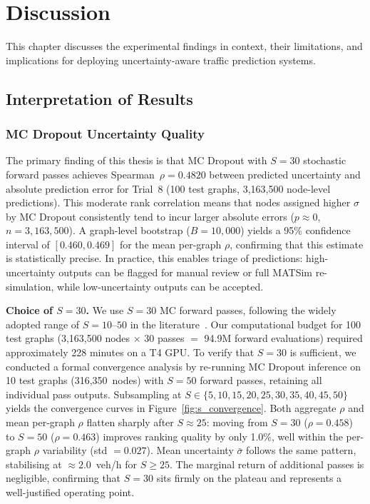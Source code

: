 
\chapter{Discussion}\label{chapter:discussion}

This chapter discusses the experimental findings in context, their limitations, and implications for deploying uncertainty-aware traffic prediction systems.

\section{Interpretation of Results}

\subsection{MC Dropout Uncertainty Quality}

The primary finding of this thesis is that MC Dropout with $S = 30$ stochastic forward passes achieves Spearman~$\rho = 0.4820$ between predicted uncertainty and absolute prediction error for Trial~8 (100 test graphs, 3,163,500 node-level predictions). This moderate rank correlation means that nodes assigned higher $\sigma$ by MC Dropout consistently tend to incur larger absolute errors ($p \approx 0$, $n = 3{,}163{,}500$). A graph-level bootstrap ($B = 10{,}000$) yields a 95\% confidence interval of $[0.460, 0.469]$ for the mean per-graph $\rho$, confirming that this estimate is statistically precise. In practice, this enables triage of predictions: high-uncertainty outputs can be flagged for manual review or full MATSim re-simulation, while low-uncertainty outputs can be accepted.

\textbf{Choice of $S = 30$.} We use $S = 30$ MC forward passes, following the widely adopted range of $S = 10$--$50$ in the literature~\cite{gal2016dropout, lakshminarayanan2017simple}. Our computational budget for 100 test graphs (3,163,500 nodes $\times$ 30 passes $=$ 94.9M forward evaluations) required approximately 228 minutes on a T4 GPU.  To verify that $S = 30$ is sufficient, we conducted a formal convergence analysis by re-running MC Dropout inference on 10 test graphs (316,350~nodes) with $S = 50$ forward passes, retaining all individual pass outputs.  Subsampling at $S \in \{5, 10, 15, 20, 25, 30, 35, 40, 45, 50\}$ yields the convergence curves in Figure~\ref{fig:s_convergence}.  Both aggregate $\rho$ and mean per-graph $\rho$ flatten sharply after $S \approx 25$: moving from $S = 30$ ($\rho = 0.458$) to $S = 50$ ($\rho = 0.463$) improves ranking quality by only 1.0\%, well within the per-graph $\rho$ variability (std $= 0.027$).  Mean uncertainty $\bar{\sigma}$ follows the same pattern, stabilising at $\approx 2.0$~veh/h for $S \geq 25$.  The marginal return of additional passes is negligible, confirming that $S = 30$ sits firmly on the plateau and represents a well-justified operating point.

